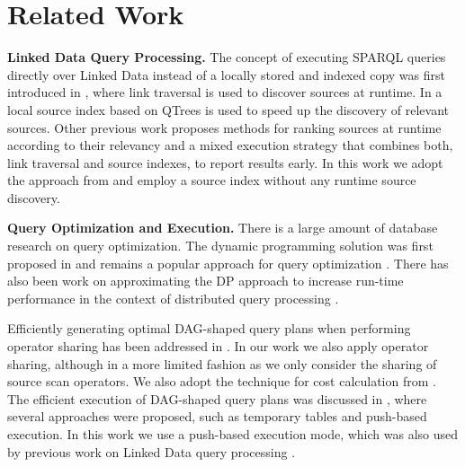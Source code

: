 \section{Related Work}
\label{sec:related}

\textbf{Linked Data Query Processing.} The concept of executing SPARQL
queries directly over Linked Data instead of a locally stored and
indexed copy was first introduced in \cite{hartig_executing_2009},
where link traversal is used to discover sources at runtime. In
\cite{harth_data_2010} a local source index based on QTrees is used to
speed up the discovery of relevant sources. Other previous work
\cite{ladwig_linked_2010,sihjoin_2011} proposes methods for ranking
sources at runtime according to their relevancy and a mixed execution
strategy that combines both, link traversal and source indexes, to
report results early. In this work we adopt the approach from
\cite{harth_data_2010} and employ a source index without any runtime
source discovery. %






\textbf{Query Optimization and Execution.} There is a large amount of
database research on query optimization. The dynamic programming
solution was first proposed in \cite{selinger_access_1979} and remains a
popular approach for query optimization
\cite{moerkotte_analysis_2006,moerkotte_dynamic_2008}. There has also
been work on approximating the DP approach to increase run-time
performance in the context of distributed query processing
\cite{kossmann_iterative_2000}.

Efficiently generating optimal DAG-shaped query plans when performing
operator sharing has been addressed in
\cite{neumann_generating_2009}. In our work we also apply operator
sharing, although in a more limited fashion as we only consider the
sharing of source scan operators. We also adopt the technique for cost
calculation from \cite{neumann_generating_2009}. The efficient
execution of DAG-shaped query plans was discussed in
\cite{Neumann_2005}, where several approaches were proposed, such as
temporary tables and push-based execution. In this work we use a
push-based execution mode, which was also used by previous work on
Linked Data query processing \cite{ladwig_linked_2010,sihjoin_2011}.

